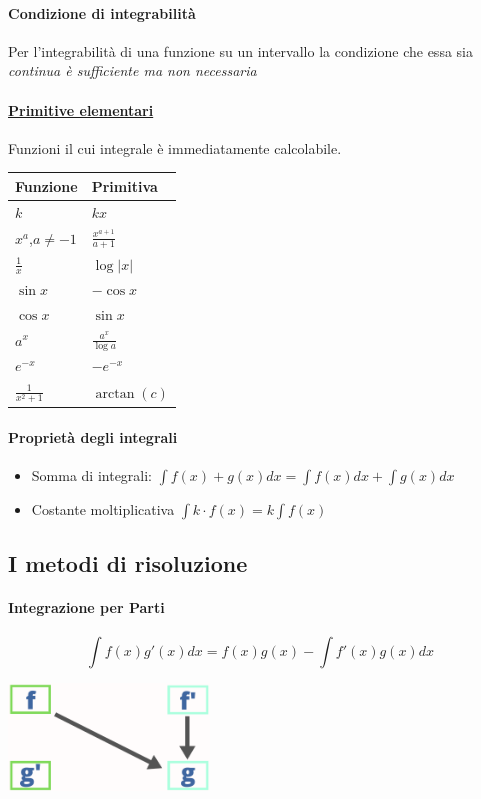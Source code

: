 \documentclass[12pt, a4paper]{article}
\begin{document}
	\paragraph*{Condizione di integrabilità} Per l'integrabilità di una funzione su un intervallo la condizione
	che essa sia \emph{continua è sufficiente ma non necessaria}
	\begin{multicols}{3}
		\paragraph*{\underline{Primitive elementari}}
		Funzioni il cui integrale è immediatamente calcolabile.
		\columnbreak
		\begin{tabularx}{0.7\textwidth}{ |Y|Y| }
			\hline
			\textbf{Funzione} & \textbf{Primitiva}    \\
			\hline
			$k$               & $kx$                  \\
			$x^a$,$a\neq-1$   & $\frac{x^{a+1}}{a+1}$ \\
			$\frac{1}{x}$     & $\log|x|$             \\
			$\sin x$          & $-\cos x$             \\
			$\cos x $         & $\sin x$              \\
			$a^x$             & $\frac{a^x}{\log a}$  \\
			\hline
			$e^{-x}$          & $-e^{-x}$             \\
			$\frac{1}{x^2+1}$ & $\arctan (c)$         \\
			\hline
		\end{tabularx}
	\end{multicols}

	\paragraph*{Proprietà degli integrali}
	\begin{itemize}
		\item Somma di integrali: $\int f(x)+g(x) dx = \int f(x) dx + \int g(x) dx$
		\item Costante moltiplicativa $\int k \cdot f(x) = k \int f(x)$
	\end{itemize}
	\subsection*{I metodi di risoluzione}
	\paragraph*{Integrazione per Parti}
	$$\int f(x)g'(x)dx = f(x)g(x)-\int f'(x)g(x)dx$$
	\begin{center}
		\includegraphics[width=0.4\textwidth]{integrazione-per-parti.png}
	\end{center}
\end{document}
